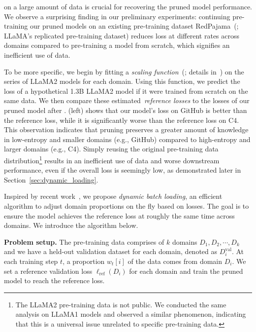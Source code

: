 \Ct{} on a large amount of data is crucial for recovering the pruned model performance. We observe a surprising finding in our preliminary experiments:
continuing pre-training our pruned models on an existing pre-training dataset RedPajama~(\citealp{together2023redpajama}; LLaMA's replicated pre-training dataset)
reduces loss at different rates across domains compared to pre-training a model from scratch, which signifies an inefficient use of data.

To be more specific, we begin by fitting a \textit{scaling function}~(\citealp{hoffmann2022training}; details in~) on the series of LLaMA2 models for each domain. Using this function, we predict the loss of a hypothetical 1.3B LLaMA2 model if it were trained from scratch on the same data. We then compare these estimated~\textit{reference losses} to the losses of our pruned model after \ct{}. 
 (left) shows that our model's loss on GitHub is better than the reference loss, while it is significantly worse than the reference loss on C4. This observation indicates that pruning preserves a greater amount of knowledge in low-entropy and smaller domains (e.g., GitHub) compared to high-entropy and larger domains (e.g., C4).
Simply reusing the original pre-training data distribution\footnote{The LLaMA2 pre-training data is not public. We conducted the same analysis on LLaMA1 models and observed a similar phenomenon, indicating that this is a universal issue unrelated to specific pre-training data.} results in an inefficient use of data and worse downstream performance, even if the overall loss is seemingly low, as demonstrated later in Section~\ref{sec:dynamic_loading}.

Inspired by recent work~\citep{xie2023doremi}, 
we propose 
\textit{dynamic batch loading}, 
an efficient algorithm to adjust domain proportions %
 on the fly based on losses. The goal is to ensure the model achieves the reference loss at roughly the same time across domains. We introduce the algorithm below.

\textbf{Problem setup.} The pre-training data comprises of $k$ domains $D_1, D_2, \cdots, D_k$ and we have a held-out validation dataset for each domain, denoted as $D_i^{\mathrm{val}}$. 
At each training step $t$, 
a proportion $w_t[i]$ of the data comes from domain $D_i$. %
We set a reference validation loss $\ell_{\mathrm{ref}}(D_i)$ for each domain and train the pruned model to reach the reference loss.

